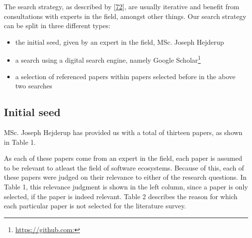 \documentclass[]{book}
\providecommand{\tightlist}{%
  \setlength{\itemsep}{0pt}\setlength{\parskip}{0pt}}
\let\rmarkdownfootnote\footnote%
\def\footnote{\protect\rmarkdownfootnote}
\begin{document}
The search strategy, as described by
{[}\protect\hyperlink{ref-Kitchenham2004}{72}{]}, are usually iterative
and benefit from consultations with experts in the field, amongst other
things. Our search strategy can be split in three different types:

\begin{itemize}
\tightlist
\item
  the initial seed, given by an expert in the field, MSc. Joseph
  Hejderup
\item
  a search using a digital search engine, namely Google
  Scholar\footnote{\url{https://github.com:}}
\item
  a selection of referenced papers within papers selected before in the
  above two searches
\end{itemize}

\subsection{Initial seed}\label{initial-seed}

MSc. Joseph Hejderup has provided us with a total of thirteen papers, as
shown in Table 1.

As each of these papers come from an expert in the field, each paper is
assumed to be relevant to atleast the field of software ecosystems.
Because of this, each of these papers were judged on their relevance to
either of the research questions. In Table 1, this relevance judgment is
shown in the left column, since a paper is only selected, if the paper
is indeed relevant. Table 2 describes the reason for which each
particular paper is not selected for the literature survey.
\end{document}
